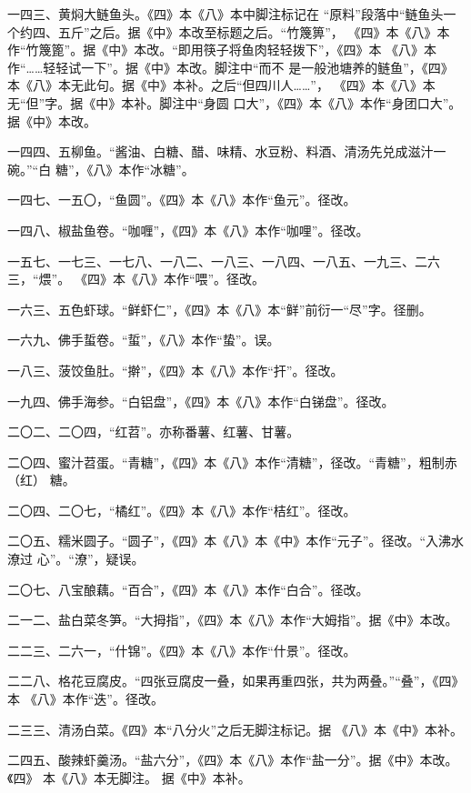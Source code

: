 \begin{list}{}
一四三、黄焖大鲢鱼头。《四》本《八》本中脚注标记{\footnotesize{}}在
“原料”段落中“鲢鱼头一个约四、五斤”之后。据《中》本改至标题之后。“竹篾箅”，
《四》本《八》本作“竹篾篦”。据《中》本改。“即用筷子将鱼肉轻轻拨下”，《四》本
《八》本作“……轻轻试一下”。据《中》本改。脚注{\footnotesize{}}中“而不
是一般池塘养的鲢鱼”，《四》本《八》本无此句。据《中》本补。之后“但四川人……”，
《四》本《八》本无“但”字。据《中》本补。脚注{\footnotesize{}}中“身圆
口大”，《四》本《八》本作“身团口大”。据《中》本改。

一四四、五柳鱼。“酱油、白糖、醋、味精、水豆粉、料酒、清汤先兑成滋汁一碗。”“白
糖”，《八》本作“冰糖”。

一四七、一五〇，“鱼圆”。《四》本《八》本作“鱼元”。径改。

一四八、椒盐鱼卷。“咖喱”，《四》本《八》本作“咖哩”。径改。

一五七、一七三、一七八、一八二、一八三、一八四、一八五、一九三、二六三，“煨”。
《四》本《八》本作“喂”。径改。

一六三、五色虾球。“鲜虾仁”，《四》本《八》本“鲜”前衍一“尽”字。径删。

一六九、佛手蜇卷。“蜇”，《八》本作“蛰”。误。

一八三、菠饺鱼肚。“擀”，《四》本《八》本作“扞”。径改。

一九四、佛手海参。“白铝盘”，《四》本《八》本作“白锑盘”。径改。

二〇二、二〇四，“红苕”。亦称番薯、红薯、甘薯。

二〇四、蜜汁苕蛋。“青糖”，《四》本《八》本作“清糖”，径改。“青糖”，粗制赤（红）
糖。

二〇四、二〇七，“橘红”。《四》本《八》本作“桔红”。径改。

二〇五、糯米圆子。“圆子”，《四》本《八》本《中》本作“元子”。径改。“入沸水潦过
心”。“潦”，疑误。

二〇七、八宝酿藕。“百合”，《四》本《八》本作“白合”。径改。

二一二、盐白菜冬笋。“大拇指”，《四》本《八》本作“大姆指”。据《中》本改。

二二三、二六一，“什锦”。《四》本《八》本作“什景”。径改。

二二八、格花豆腐皮。“四张豆腐皮一叠，如果再重四张，共为两叠。”“叠”，《四》本
《八》本作“迭”。径改。

二三三、清汤白菜。《四》本“八分火”之后无脚注标记{\footnotesize{}}。据
《八》本《中》本补。

二四五、酸辣虾羹汤。“盐六分”，《四》本《八》本作“盐一分”。据《中》本改。《四》
本《八》本无脚注{\footnotesize{}}。
据《中》本补。


\end{list}
